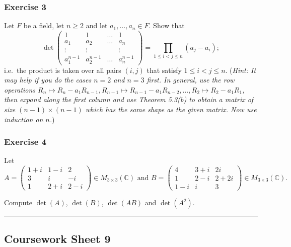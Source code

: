 \documentclass[
  12pt,
  a4paper,
  twoside]{article}
\theoremstyle{plain}
\theoremstyle{definition}
\begin{document}
\hypertarget{exercise-3-7}{%
\subsubsection*{Exercise 3}\label{exercise-3-7}}

Let \(F\) be a field, let \(n\ge 2\) and let \(a_1, \ldots, a_n \in F\).
Show that
\[\det\left(\begin{array}{cccc} 1 & 1 & \ldots & 1 \\ a_1 & a_2 &
\ldots & a_n \\ \vdots & \vdots & & \vdots \\ a_1^{n-1} &
a_2^{n-1} & \ldots & a_n^{n-1} \end{array}\right) = \prod_{1 \le i
< j \le n} (a_j - a_i);\] i.e.~the product is taken over all
pairs \((i,j)\) that satisfy \(1 \le i < j \le n\). (\emph{Hint: It may
help if you do the cases \(n=2\) and \(n=3\) first. In general, use
the row operations \(R_n \mapsto R_n - a_1 R_{n-1}, R_{n-1} \mapsto R_{n-1} - a_1 R_{n-2}, \ldots, R_2 \mapsto R_2-a_1 R_1\), then
expand along the first column and use Theorem 5.3(b) to obtain a
matrix of size \((n-1) \times (n-1)\) which has the same shape as
the given matrix. Now use induction on \(n\).})

\hypertarget{exercise-4-5}{%
\subsubsection*{Exercise 4}\label{exercise-4-5}}

Let \(A = \left(\begin{array}{ccc} 1+i & 1-i & 2 \\ 3 & i & -i \\ 1 & 2+i & 2-i \end{array}\right) \in M_{3 \times 3}(\mathbb{C}) \textrm{ and } B = \left(\begin{array}{ccc} 4 & 3+i & 2i \\ 1 & 2-i & 2+2i \\ 1-i & i & 3 \end{array}\right) \in M_{3 \times 3}(\mathbb{C}).\)

Compute \(\det(A)\), \(\det(B)\), \(\det(AB)\) and \(\det(A^2)\).

\begin{center}\rule{0.5\linewidth}{0.5pt}\end{center}

\hypertarget{coursework-sheet-9}{%
\subsection{Coursework Sheet 9}\label{coursework-sheet-9}}
\end{document}
